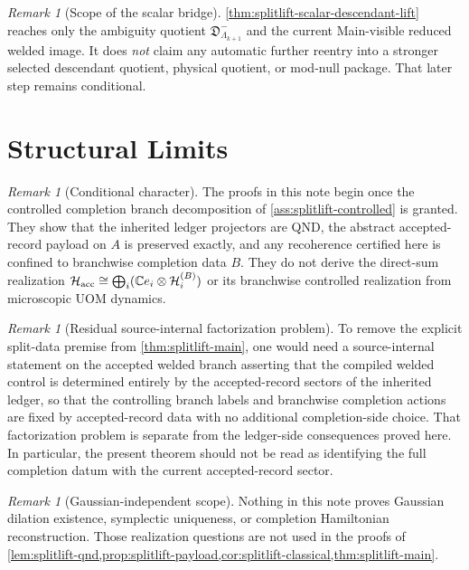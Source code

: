 \documentclass[11pt]{article}
\theoremstyle{definition}
\theoremstyle{plain}
\theoremstyle{remark}
\newtheorem{remark}[definition]{Remark}
\newcommand{\Hacc}{\mathcal H_{\rm acc}}
\newcommand{\1}{\mathbf 1}
\begin{document}
\begin{remark}[Scope of the scalar bridge]
\label{rem:splitlift-scalar-bridge-scope}
\cref{thm:splitlift-scalar-descendant-lift} reaches only the ambiguity quotient
\(
\mathfrak D^-_{\Lambda_{k+1}}
\)
and the current Main-visible reduced welded image.
It does \emph{not} claim any automatic further reentry into a stronger selected descendant quotient,
physical quotient, or mod-null package.
That later step remains conditional.
\end{remark}

\section{Structural Limits}
\label{sec:splitlift-boundaries}

\begin{remark}[Conditional character]
\label{rem:splitlift-conditional}
\label{rem:splitlift-upgrade}
\label{rem:splitlift-gate}
The proofs in this note begin once the controlled completion branch decomposition of
\cref{ass:splitlift-controlled} is granted.
They show that the inherited ledger projectors are QND, the abstract accepted-record payload on
\(A\) is preserved exactly, and any recoherence certified here is confined to branchwise
completion data \(B\).
They do not derive the direct-sum realization
\(
\Hacc\cong\bigoplus_i (\mathbb C e_i\otimes \mathcal H_i^{(B)})
\)
or its branchwise controlled realization from microscopic UOM dynamics.
\end{remark}

\begin{remark}[Residual source-internal factorization problem]
\label{rem:splitlift-blocker}
\label{rem:splitlift-blocker-physical}
To remove the explicit split-data premise from \cref{thm:splitlift-main}, one would need a
source-internal statement on the accepted welded branch asserting that the compiled welded control is
determined entirely by the accepted-record sectors of the inherited ledger, so that the controlling
branch labels and branchwise completion actions are fixed by accepted-record data with no additional
completion-side choice.
That factorization problem is separate from the ledger-side consequences proved here.
In particular, the present theorem should not be read as identifying the full completion datum with
the current accepted-record sector.
\end{remark}

\begin{remark}[Gaussian-independent scope]
\label{rem:splitlift-gaussian-fence}
Nothing in this note proves Gaussian dilation existence, symplectic uniqueness, or completion
Hamiltonian reconstruction.
Those realization questions are not used in the proofs of
\cref{lem:splitlift-qnd,prop:splitlift-payload,cor:splitlift-classical,thm:splitlift-main}.
\end{remark}
\end{document}
